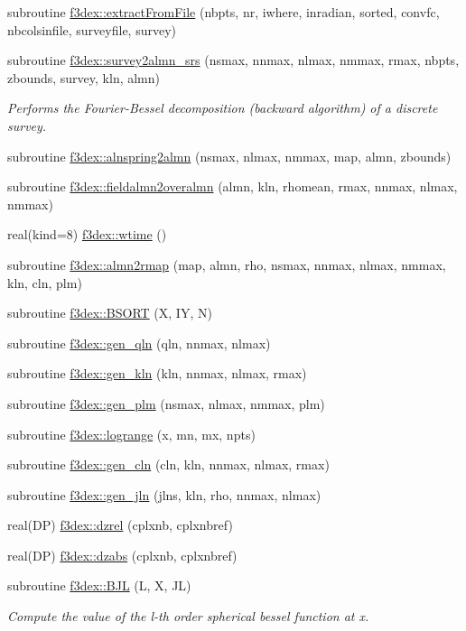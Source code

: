 \begin{DoxyCompactItemize}
\item 
subroutine \hyperlink{namespacef3dex_a2efa7687f0b6591321e5c86ea09aa1a7}{f3dex::extractFromFile} (nbpts, nr, iwhere, inradian, sorted, convfc, nbcolsinfile, surveyfile, survey)
\item 
subroutine \hyperlink{namespacef3dex_a177ac0f41749e15dd33c7a4477d13a0e}{f3dex::survey2almn\_\-srs} (nsmax, nnmax, nlmax, nmmax, rmax, nbpts, zbounds, survey, kln, almn)
\begin{DoxyCompactList}\small\item\em Performs the Fourier-\/Bessel decomposition (backward algorithm) of a discrete survey. \end{DoxyCompactList}\item 
subroutine \hyperlink{namespacef3dex_ae28575da877299326cf5d412b7bda063}{f3dex::alnspring2almn} (nsmax, nlmax, nmmax, map, almn, zbounds)
\item 
subroutine \hyperlink{namespacef3dex_a902c376a4e5d7c84a39d6274dc904602}{f3dex::fieldalmn2overalmn} (almn, kln, rhomean, rmax, nnmax, nlmax, nmmax)
\item 
real(kind=8) \hyperlink{namespacef3dex_ac014e878f644407cfc3eb1af25137d44}{f3dex::wtime} ()
\item 
subroutine \hyperlink{namespacef3dex_ae2e71647b18208d49ce5ebc6dcc3dbea}{f3dex::almn2rmap} (map, almn, rho, nsmax, nnmax, nlmax, nmmax, kln, cln, plm)
\item 
subroutine \hyperlink{namespacef3dex_ac32aa4a30199fa62b6212bea55f59ff5}{f3dex::BSORT} (X, IY, N)
\item 
subroutine \hyperlink{namespacef3dex_ac7199c2a98971bf758240066422f4a5e}{f3dex::gen\_\-qln} (qln, nnmax, nlmax)
\item 
subroutine \hyperlink{namespacef3dex_a7aceee3f16c8792cfe12b2d7a53d7acc}{f3dex::gen\_\-kln} (kln, nnmax, nlmax, rmax)
\item 
subroutine \hyperlink{namespacef3dex_a8ff17a3652c0f3145393cc45fe0a2a6b}{f3dex::gen\_\-plm} (nsmax, nlmax, nmmax, plm)
\item 
subroutine \hyperlink{namespacef3dex_a6a90245c19e73ec2ce1f8fc42e4ab909}{f3dex::logrange} (x, mn, mx, npts)
\item 
subroutine \hyperlink{namespacef3dex_adcf1cf51ac34f733e7a776a7df065524}{f3dex::gen\_\-cln} (cln, kln, nnmax, nlmax, rmax)
\item 
subroutine \hyperlink{namespacef3dex_ad15a4c29088690f9ee5b97799abfc4a5}{f3dex::gen\_\-jln} (jlns, kln, rho, nnmax, nlmax)
\item 
real(DP) \hyperlink{namespacef3dex_aaab16fb8c4e26a33aa182fcad7916a59}{f3dex::dzrel} (cplxnb, cplxnbref)
\item 
real(DP) \hyperlink{namespacef3dex_aae21ba3275637af7c40a0f4810f890b8}{f3dex::dzabs} (cplxnb, cplxnbref)
\item 
subroutine \hyperlink{namespacef3dex_ae7f16ddea56702ffd83912c6def516d4}{f3dex::BJL} (L, X, JL)
\begin{DoxyCompactList}\small\item\em Compute the value of the l-\/th order spherical bessel function at x. \end{DoxyCompactList}\end{DoxyCompactItemize}
